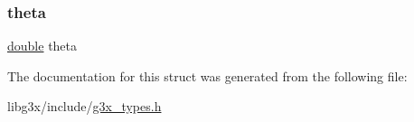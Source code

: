 \subsubsection{\texorpdfstring{theta}{theta}}
{\footnotesize\ttfamily \hyperlink{g3x__transfo_8h_a89b2b23e407882a535d835574a7912e1}{double} theta}



The documentation for this struct was generated from the following file\+:\begin{DoxyCompactItemize}
\item 
libg3x/include/\hyperlink{g3x__types_8h}{g3x\+\_\+types.\+h}\end{DoxyCompactItemize}

